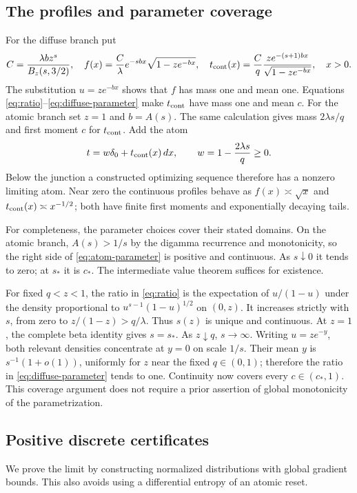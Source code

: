 \documentclass[11pt]{article}
\begin{document}
\subsection{The profiles and parameter coverage}
For the diffuse branch put
\[
 C=\frac{\lambda b z^s}{B_z(s,3/2)},\quad
 f(x)=\frac C\lambda e^{-sbx}\sqrt{1-ze^{-bx}},\quad
 t_{\rm cont}(x)=\frac Cq\frac{ze^{-(s+1)bx}}{\sqrt{1-ze^{-bx}}},\quad x>0.
\]
The substitution $u=ze^{-bx}$ shows that $f$ has mass one and mean one. Equations \eqref{eq:ratio}--\eqref{eq:diffuse-parameter} make $t_{\rm cont}$ have mass one and mean $c$. For the atomic branch set $z=1$ and $b=A(s)$. The same calculation gives mass $2\lambda s/q$ and first moment $c$ for $t_{\rm cont}$. Add the atom
\begin{equation}\label{eq:atom}
 t=w\delta_0+t_{\rm cont}(x)\,dx,\qquad w=1-\frac{2\lambda s}{q}\ge0.
\end{equation}
Below the junction a constructed optimizing sequence therefore has a nonzero limiting atom. Near zero the continuous profiles behave as $f(x)\asymp\sqrt x$ and $t_{\rm cont}(x)\asymp x^{-1/2}$; both have finite first moments and exponentially decaying tails.

For completeness, the parameter choices cover their stated domains. On the atomic branch, $A(s)>1/s$ by the digamma recurrence and monotonicity, so the right side of \eqref{eq:atom-parameter} is positive and continuous. As $s\downarrow0$ it tends to zero; at $s_*$ it is $c_*$. The intermediate value theorem suffices for existence.

For fixed $q<z<1$, the ratio in \eqref{eq:ratio} is the expectation of $u/(1-u)$ under the density proportional to $u^{s-1}(1-u)^{1/2}$ on $(0,z)$. It increases strictly with $s$, from zero to $z/(1-z)>q/\lambda$. Thus $s(z)$ is unique and continuous. At $z=1$, the complete beta identity gives $s=s_*$. As $z\downarrow q$, $s\to\infty$. Writing $u=ze^{-y}$, both relevant densities concentrate at $y=0$ on scale $1/s$. Their mean $y$ is $s^{-1}(1+o(1))$, uniformly for $z$ near the fixed $q\in(0,1)$; therefore the ratio in \eqref{eq:diffuse-parameter} tends to one. Continuity now covers every $c\in(c_*,1)$. This coverage argument does not require a prior assertion of global monotonicity of the parametrization.

\subsection{Positive discrete certificates}
We prove the limit by constructing normalized distributions with global gradient bounds. This also avoids using a differential entropy of an atomic reset.
\end{document}
